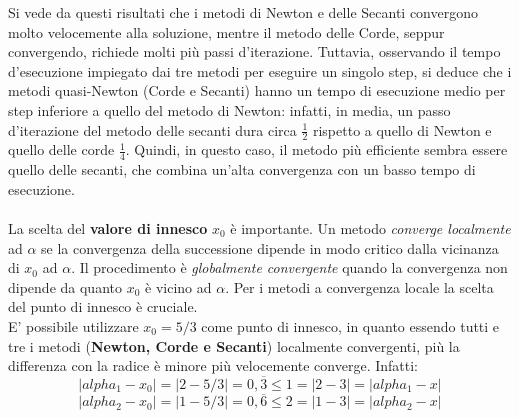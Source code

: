 Si vede da questi risultati che i metodi di Newton e delle Secanti convergono molto velocemente alla soluzione, mentre il metodo delle Corde, seppur convergendo, richiede molti più passi d'iterazione. Tuttavia, osservando il tempo d'esecuzione impiegato dai tre metodi per eseguire un singolo step, si deduce che i metodi quasi-Newton (Corde e Secanti) hanno un tempo di esecuzione medio per step inferiore a quello del metodo di Newton: infatti, in media, un passo d'iterazione del metodo delle secanti dura circa $\frac{1}{2}$ rispetto a quello di Newton e quello delle corde $\frac{1}{4}$. Quindi, in questo caso, il metodo più efficiente sembra essere quello delle secanti, che combina un'alta convergenza con un basso tempo di esecuzione.\\\\
La scelta del \textbf{valore di innesco} $x_{0}$ è importante. Un metodo \textit{converge localmente} ad $\alpha$ se la convergenza della successione dipende in modo critico dalla vicinanza di $x_{0}$ ad $\alpha$. Il procedimento è \textit{globalmente convergente} quando la convergenza non dipende da quanto $x_{0}$ è vicino ad $\alpha$. Per i metodi a convergenza locale la scelta del punto di innesco è cruciale.\\
E' possibile utilizzare $x_{0}=5/3$ come punto di innesco, in quanto essendo tutti e tre i metodi (\textbf{Newton, Corde e Secanti}) localmente convergenti, più la differenza con la radice è minore più velocemente converge. Infatti:
\[
|alpha_1 - x_{0}| = |2 - 5/3| = 0,\overline{3} \leq 1 = |2 - 3| = |alpha_1 - x|
\]
\[
|alpha_2 - x_{0}| = |1 - 5/3| = 0,\overline{6} \leq 2 = |1 - 3| = |alpha_2 - x|
\]
